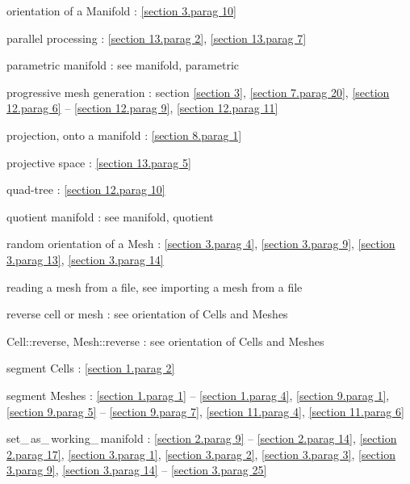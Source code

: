 \documentclass[a4paper]{scrreprt}
\def\numb{}
\newcommand\verm[1]{\textcolor{manif}{#1}}
\renewcommand\tt{\normalfont\ttfamily}
\begin{document}
\noindent
orientation of a {\small\tt \verm{Manifold}} : \ref{\numb section 3.\numb parag 10}

\noindent
parallel processing : \ref{\numb section 13.\numb parag 2}, \ref{\numb section 13.\numb parag 7}

\noindent
parametric manifold : see manifold, parametric

\noindent
progressive mesh generation : section \ref{\numb section 3}, \ref{\numb section 7.\numb parag 20},
\ref{\numb section 12.\numb parag 6} -- \ref{\numb section 12.\numb parag 9},
\ref{\numb section 12.\numb parag 11}

\noindent
projection, onto a manifold :
\ref{\numb section 8.\numb parag 1}

\noindent
projective space : \ref{\numb section 13.\numb parag 5}

\noindent
quad-tree : \ref{\numb section 12.\numb parag 10}

\noindent
quotient manifold : see manifold, quotient

\noindent
random orientation of a {\small\tt\verm{Mesh}} : \ref{\numb section 3.\numb parag 4},
\ref{\numb section 3.\numb parag 9}, \ref{\numb section 3.\numb parag 13},
\ref{\numb section 3.\numb parag 14}

\noindent
reading a mesh from a file, see importing a mesh from a file

\noindent
reverse cell or mesh : see orientation of {\small\tt \verm{Cell}}s and {\small\tt \verm{Mesh}}es

\noindent
{\small\tt\verm{Cell}::reverse}, {\small\tt\verm{Mesh}::reverse} :
see orientation of {\small\tt \verm{Cell}}s and {\small\tt \verm{Mesh}}es

\noindent
segment {\small\tt \verm{Cell}}s : \ref{\numb section 1.\numb parag 2}

\noindent
segment {\small\tt \verm{Mesh}}es :
\ref{\numb section 1.\numb parag 1} -- \ref{\numb section 1.\numb parag 4},
\ref{\numb section 9.\numb parag 1}, \ref{\numb section 9.\numb parag 5} --
\ref{\numb section 9.\numb parag 7}, \ref{\numb section 11.\numb parag 4},
\ref{\numb section 11.\numb parag 6}

\noindent
{\small\tt set\_\,as\_\,working\_\,manifold} :
\ref{\numb section 2.\numb parag 9} -- \ref{\numb section 2.\numb parag 14},
\ref{\numb section 2.\numb parag 17}, \ref{\numb section 3.\numb parag 1},
\ref{\numb section 3.\numb parag 2}, \ref{\numb section 3.\numb parag 3},
\ref{\numb section 3.\numb parag 9},
\ref{\numb section 3.\numb parag 14} -- \ref{\numb section 3.\numb parag 25}
\end{document}
